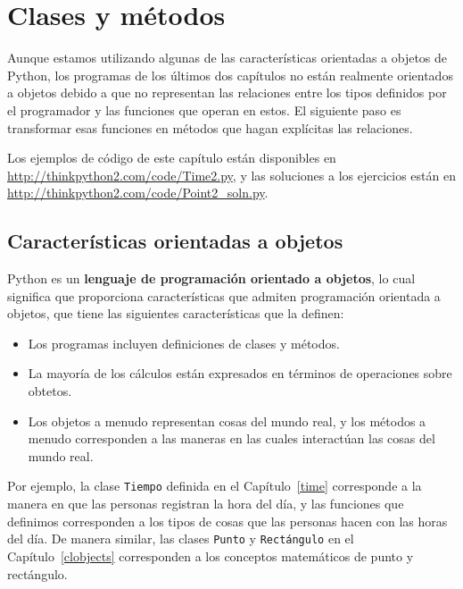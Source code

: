 \documentclass[10pt]{book}
\begin{document}
\chapter{Clases y métodos}

Aunque estamos utilizando algunas de las características orientadas a objetos de Python,
los programas de los últimos dos capítulos no están realmente
orientados a objetos debido a que no representan las relaciones
entre los tipos definidos por el programador y las funciones que operan
en estos.  El siguiente paso es transformar esas funciones en
métodos que hagan explícitas las relaciones.

Los ejemplos de código de este capítulo están disponibles en
\url{http://thinkpython2.com/code/Time2.py}, y las soluciones
a los ejercicios están en \url{http://thinkpython2.com/code/Point2_soln.py}.


\section{Características orientadas a objetos}

Python es un {\bf lenguaje de programación orientado a objetos}, lo cual significa
que proporciona características que admiten programación
orientada a objetos, que tiene las siguientes características que la definen:

\begin{itemize}

\item Los programas incluyen definiciones de clases y métodos.

\item La mayoría de los cálculos están expresados en términos de operaciones sobre
  obtetos.

\item Los objetos a menudo representan cosas
del mundo real, y los métodos a menudo
corresponden a las maneras en las cuales interactúan las cosas del mundo real.

\end{itemize}

Por ejemplo, la clase {\tt Tiempo} definida en el Capítulo~\ref{time}
corresponde a la manera en que las personas registran la hora del día, y las
funciones que definimos corresponden a los tipos de cosas que las personas hacen con
las horas del día.  De manera similar, las clases {\tt Punto} y {\tt Rectángulo}
en el Capítulo~\ref{clobjects}
corresponden a los conceptos matemáticos de punto y rectángulo.
\end{document}

